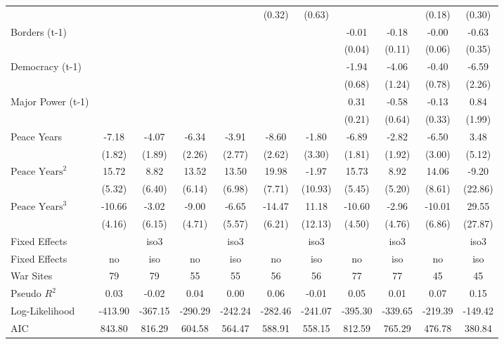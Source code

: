 \begin{tabular}{lcccccccccc}
&  &  &  &  & (0.32) & (0.63) &  &  & (0.18) & (0.30) \\
Borders (t-1) &  &  &  &  &  &  & -0.01 & -0.18 & -0.00 & -0.63 \\
&  &  &  &  &  &  & (0.04) & (0.11) & (0.06) & (0.35) \\
Democracy (t-1) &  &  &  &  &  &  & -1.94 & -4.06 & -0.40 & -6.59 \\
&  &  &  &  &  &  & (0.68) & (1.24) & (0.78) & (2.26) \\
Major Power (t-1) &  &  &  &  &  &  & 0.31 & -0.58 & -0.13 & 0.84 \\
&  &  &  &  &  &  & (0.21) & (0.64) & (0.33) & (1.99) \\
Peace Years & -7.18 & -4.07 & -6.34 & -3.91 & -8.60 & -1.80 & -6.89 & -2.82 & -6.50 & 3.48 \\
& (1.82) & (1.89) & (2.26) & (2.77) & (2.62) & (3.30) & (1.81) & (1.92) & (3.00) & (5.12) \\
$\text{Peace Years}^2$ & 15.72 & 8.82 & 13.52 & 13.50 & 19.98 & -1.97 & 15.73 & 8.92 & 14.06 & -9.20 \\
& (5.32) & (6.40) & (6.14) & (6.98) & (7.71) & (10.93) & (5.45) & (5.20) & (8.61) & (22.86) \\
$\text{Peace Years}^3$ & -10.66 & -3.02 & -9.00 & -6.65 & -14.47 & 11.18 & -10.60 & -2.96 & -10.01 & 29.55 \\
& (4.16) & (6.15) & (4.71) & (5.57) & (6.21) & (12.13) & (4.50) & (4.76) & (6.86) & (27.87) \\
Fixed Effects &  & iso3 &  & iso3 &  & iso3 &  & iso3 &  & iso3 \\
\midrule
Fixed Effects & no & iso & no & iso & no & iso & no & iso & no & iso \\
War Sites & 79 & 79 & 55 & 55 & 56 & 56 & 77 & 77 & 45 & 45 \\
Pseudo $R^2$ & 0.03 & -0.02 & 0.04 & 0.00 & 0.06 & -0.01 & 0.05 & 0.01 & 0.07 & 0.15 \\
Log-Likelihood & -413.90 & -367.15 & -290.29 & -242.24 & -282.46 & -241.07 & -395.30 & -339.65 & -219.39 & -149.42 \\
AIC & 843.80 & 816.29 & 604.58 & 564.47 & 588.91 & 558.15 & 812.59 & 765.29 & 476.78 & 380.84 \\
\bottomrule
\end{tabular}
